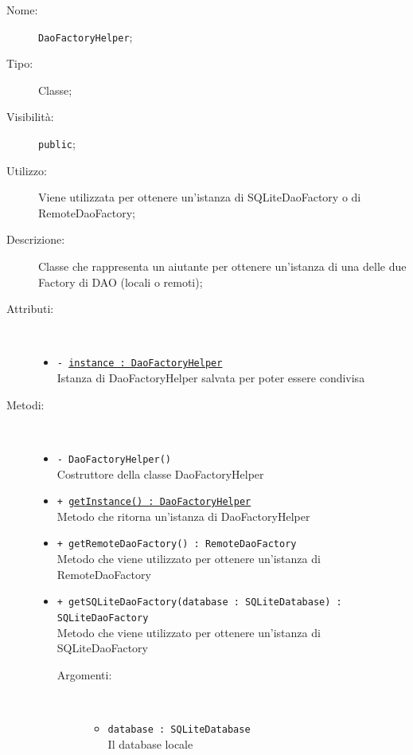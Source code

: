 \documentclass[../DefinizioneDiProdotto.tex]{subfiles}
\begin{document}
\begin{description}
	\item[Nome:] \texttt{DaoFactoryHelper};
	\item[Tipo:] Classe;
	\item[Visibilità:] \texttt{public};
	\item[Utilizzo:] Viene utilizzata per ottenere un'istanza di SQLiteDaoFactory o di RemoteDaoFactory;
	\item[Descrizione:] Classe che rappresenta un aiutante per ottenere un'istanza di una delle due Factory di DAO (locali o remoti);
	\item[Attributi:] \
	\begin{itemize}
		\item \texttt{- \underline{instance : DaoFactoryHelper}}\\
		Istanza di DaoFactoryHelper salvata per poter essere condivisa
		
	\end{itemize}
	\item[Metodi:] \
	\begin{itemize}
		\item \texttt{- DaoFactoryHelper()}\\
		Costruttore della classe DaoFactoryHelper
		\item \texttt{+ \underline{getInstance() : DaoFactoryHelper}}\\
		Metodo che ritorna un'istanza di DaoFactoryHelper
		\item \texttt{+ getRemoteDaoFactory() : RemoteDaoFactory}\\
		Metodo che viene utilizzato per ottenere un'istanza di RemoteDaoFactory
		\item \texttt{+ getSQLiteDaoFactory(database : SQLiteDatabase) :\\ SQLiteDaoFactory}\\
		Metodo che viene utilizzato per ottenere un'istanza di SQLiteDaoFactory
		\begin{description}
			\item[Argomenti:] \
			\begin{itemize}
				\item \texttt{database : SQLiteDatabase}\\
				Il database locale\end{itemize}
		\end{description}
	\end{itemize}
\end{description}
\end{document}
